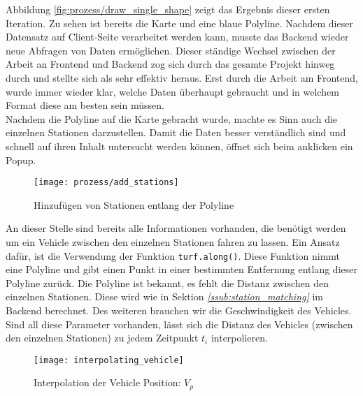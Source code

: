 \begin{newpage}
    Abbildung \ref{fig:prozess/draw_single_shape} zeigt das Ergebnis dieser ersten Iteration. Zu sehen ist bereits die Karte und eine blaue Polyline. Nachdem dieser Datensatz auf Client-Seite verarbeitet werden kann, musste das Backend wieder neue Abfragen von Daten ermöglichen. Dieser ständige Wechsel zwischen der Arbeit an Frontend und Backend zog sich durch das gesamte Projekt hinweg durch und stellte sich als sehr effektiv heraus. Erst durch die Arbeit am Frontend, wurde immer wieder klar, welche Daten überhaupt gebraucht und in welchem Format diese am besten sein müssen.\\

    Nachdem die Polyline auf die Karte gebracht wurde, machte es Sinn auch die einzelnen Stationen darzustellen. Damit die Daten besser verständlich sind und schnell auf ihren Inhalt untersucht werden können, öffnet sich beim anklicken ein Popup.

    \begin{figure}[htbp]
      \begin{center}
        \texttt{[image: prozess/add\_stations]}
        \caption{Hinzufügen von Stationen entlang der Polyline}
        \label{fig:prozess/add_stations}
      \end{center}
    \end{figure}

    An dieser Stelle sind bereits alle Informationen vorhanden, die benötigt werden um ein Vehicle zwischen den einzelnen Stationen fahren zu lassen. Ein Ansatz dafür, ist die Verwendung der Funktion \texttt{turf.along()}. Diese Funktion nimmt eine Polyline und gibt einen Punkt in einer bestimmten Entfernung entlang dieser Polyline zurück. Die Polyline ist bekannt, es fehlt die Distanz zwischen den einzelnen Stationen. Diese wird wie in Sektion \textit{\ref{ssub:station_matching} } im Backend berechnet. Des weiteren brauchen wir die Geschwindigkeit des Vehicles. Sind all diese Parameter vorhanden, lässt sich die Distanz des Vehicles (zwischen den einzelnen Stationen) zu jedem Zeitpunkt $t_i$ interpolieren.

    \begin{figure}[htbp]
      \begin{center}
        \texttt{[image: interpolating\_vehicle]}
        \caption{Interpolation der Vehicle Position: $V_p$}
        \label{fig:interpolating_vehicle}
      \end{center}
    \end{figure}


\end{newpage}
